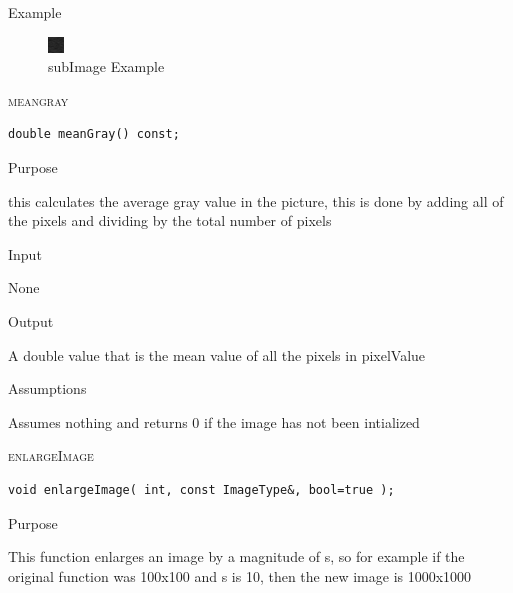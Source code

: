 \documentclass[pdftex, 11pt]{article}
\begin{document}
\begin{description}
\begin{description}
			\item{Example}

				\begin{figure}[ht!]
					\centering
					\caption{subImage Example}
					\includegraphics{images/outsubimg.png}
				\end{figure}

		\end{description}


	\item{\textsc{meangray}}
		\begin{description}

\begin{lstlisting}
double meanGray() const;
\end{lstlisting}

			\item{Purpose}

				
				this calculates the average gray value in the
				picture, this is done by adding
				all of the pixels and dividing by the total
				number of pixels

			\item{Input}

				None

			\item{Output}

				A double value that is the mean value of all
				the pixels in pixelValue


			\item{Assumptions}

				Assumes nothing and returns 0 if the image 
				has not been intialized

		\end{description}


	\item{\textsc{enlargeImage}}
		\begin{description}

\begin{lstlisting}
void enlargeImage( int, const ImageType&, bool=true );
\end{lstlisting}

			\item{Purpose}
				
				This function enlarges an image by a 
				magnitude of s, so for example if the
				original function was 100x100 and s is 
				10, then the new image is 1000x1000


\end{description}
\end{description}
\end{document}
